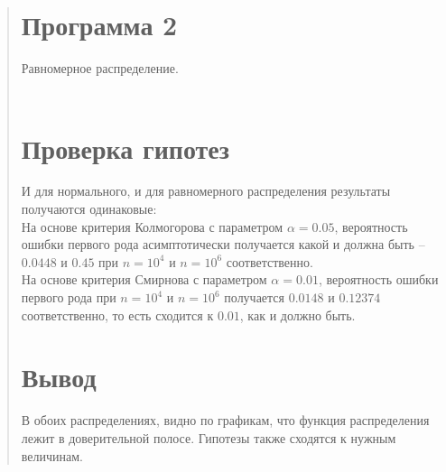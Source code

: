 \documentclass{article}
\begin{document}
\begin{quote}
\section{Программа 2}
	Равномерное распределение.\\ \\
        \begin{minipage}{\linewidth}
	    
        \end{minipage}
	
\section{Проверка гипотез}
        И для нормального, и для равномерного распределения результаты получаются одинаковые:\\
        На основе критерия Колмогорова с параметром $\alpha = 0.05$, вероятность ошибки первого рода асимптотически получается какой и должна быть -- $0.0448$ и $0.45$ при $n=10^4$ и $n=10^6$ соответственно. \\
        На основе критерия Смирнова с параметром $\alpha = 0.01$, вероятность ошибки первого рода при $n=10^4$ и $n=10^6$ получается $0.0148$ и $0.12374$ соответственно, то есть сходится к $0.01$, как и должно быть.
\section{Вывод}
	В обоих распределениях, видно по графикам, что функция распределения лежит в доверительной полосе. Гипотезы также сходятся к нужным величинам.
\end{quote}
\end{document}
